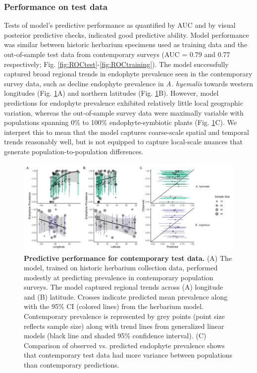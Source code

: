 \documentclass[11pt]{article}
\begin{document}
\subsubsection*{Performance on test data}
Tests of model's predictive performance as quantified by AUC and by visual posterior predictive checks, indicated good predictive ability. 
Model performance was similar between historic herbarium specimens used as training data and the out-of-sample test data from contemporary surveys (AUC = 0.79 and 0.77 respectively; Fig. \ref{fig:ROCtest}-\ref{fig:ROCtraining}).  
The model successfully captured broad regional trends in endophyte prevalence seen in the contemporary survey data, such as decline endophyte prevalence in \emph{A. hyemalis} towards western longitudes (Fig. \ref{fig:contemptestplot}A) and northern latitudes (Fig. \ref{fig:contemptestplot}B). 
However, model predictions for endophyte prevalence exhibited relatively little local geographic variation, whereas the out-of-sample survey data were maximally variable with populations spanning 0\% to 100\% endophyte-symbiotic plants (Fig. \ref{fig:contemptestplot}C).
We interpret this to mean that the model captures coarse-scale spatial and temporal trends reasonably well, but is not equipped to capture local-scale nuances that generate population-to-population differences. 

\begin{figure}[H]
	\centering
	\includegraphics[width = \linewidth]{../Plots/contemp_test_plot.png}
	\caption[Predictive performance for contemporary test data.]{\textbf{Predictive performance for contemporary test data.} (A)
		 The model, trained on historic herbarium collection data, performed modestly at predicting prevalence in contemporary population surveys. The model captured regional trends across (A) longitude and (B) latitude. Crosses indicate predicted mean prevalence along with the 95\% CI (colored lines) from the herbarium model. Contemporary prevalence is represented by grey points (point size reflects sample size) along with trend lines from generalized linear models (black line and shaded 95\% confidence interval). (C) Comparison of observed vs. predicted endophyte prevalence shows that contemporary test data had more variance between populations than contemporary predictions.}
	\label{fig:contemptestplot}
\end{figure}
\end{document}
